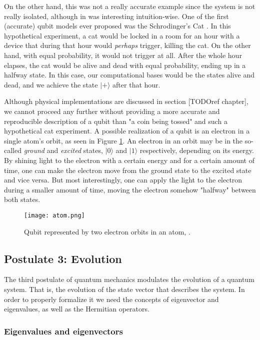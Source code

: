 On the other hand, this was not a really accurate example since the system is not really isolated, although in was interesting intuition-wise. One of the first (accurate) qubit models ever proposed was the Schrodinger's Cat \cite{Schrodinger1935} \cite{Schrodinger1935a}. In this hypothetical experiment, a cat would be locked in a room for an hour with a device that during that hour would \emph{perhaps} trigger, killing the cat. On the other hand, with equal probability, it would not trigger at all. After the whole hour elapses, the cat would be alive and dead with equal probability, ending up in a halfway state. In this case, our computational bases would be the states alive and dead, and we achieve the state $|+\rangle$ after that hour.

Although physical implementations are discussed in section [TODOref chapter], we cannot proceed any further without providing a more accurate and reproducible description of a qubit than "a coin being tossed" and such a hypothetical cat experiment. A possible realization of a qubit is an electron in a single atom's orbit, as seen in Figure \ref{fig 1.1}. An electron in an orbit may be in the so-called \emph{ground} and \emph{excited} states, $|0\rangle$ and $|1\rangle$ respectively, depending on its energy. By shining light to the electron with a certain energy and for a certain amount of time, one can make the electron move from the ground state to the excited state and vice versa. But most interestingly, one can apply the light to the electron during a smaller amount of time, moving the electron somehow "halfway" between both states.

\begin{figure}[h]
	\texttt{[image: atom.png]}
	\centering
	\caption{Qubit represented by two electron orbits in an atom, \cite{Nielsen2002}.}
	\label{fig 1.1}
\end{figure}


\subsection{Postulate 3: Evolution}


The third postulate of quantum mechanics modulates the evolution of a quantum system. That is, the evolution of the state vector that describes the system. In order to properly formalize it we need the concepts of eigenvector and eigenvalues, as well as the Hermitian operators.


\subsubsection{Eigenvalues and eigenvectors}


